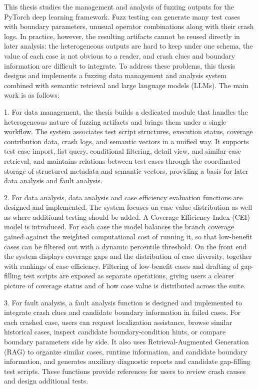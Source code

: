 \begin{eabstract}

This thesis studies the management and analysis of fuzzing outputs
for the PyTorch deep learning framework.
Fuzz testing can generate many test cases with boundary parameters,
unusual operator combinations along with their crash logs.
In practice, however, the resulting artifacts cannot be reused directly
in later analysis: the heterogeneous outputs are hard to keep under one schema,
the value of each case is not obvious to a reader,
and crash clues and boundary information are difficult to integrate.
To address these problems,
this thesis designs and implements a fuzzing data management and analysis system
combined with semantic retrieval and large language models (LLMs).
The main work is as follows:

1. For data management,
the thesis builds a dedicated module that handles the heterogeneous nature
of fuzzing artifacts and brings them under a single workflow.
The system associates test script structures, execution status,
coverage contribution data, crash logs, and semantic vectors in a unified way.
It supports test case import, list query, conditional filtering,
detail view, and similar-case retrieval,
and maintains relations between test cases through the coordinated storage
of structured metadata and semantic vectors,
providing a basis for later data analysis and fault analysis.

2. For data analysis,
data analysis and case efficiency evaluation functions are designed and implemented.
The system focuses on case value distribution
as well as where additional testing should be added.
A Coverage Efficiency Index (CEI) model is introduced.
For each case the model balances the branch coverage gained
against the weighted computational cost of running it,
so that low-benefit cases can be filtered out with a dynamic percentile threshold.
On the front end the system displays coverage gaps and the distribution of
case diversity, together with rankings of case efficiency.
Filtering of low-benefit cases and drafting of gap-filling test scripts
are exposed as separate operations,
giving users a clearer picture of coverage status
and of how case value is distributed across the suite.

3. For fault analysis,
a fault analysis function is designed and implemented
to integrate crash clues and candidate boundary information in failed cases.
For each crashed case, users can request localization assistance,
browse similar historical cases, inspect candidate boundary-condition hints,
or compare boundary parameters side by side.
It also uses Retrieval-Augmented Generation (RAG)
to organize similar cases, runtime information, and candidate boundary information,
and generates auxiliary diagnostic reports
and candidate gap-filling test scripts.
These functions provide references for users to review crash causes
and design additional tests.

\end{eabstract}
